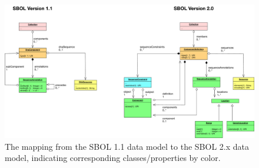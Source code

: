 \begin{figure}[h]
\begin{center}
  \includegraphics[width=\textwidth]{images/sbol_v1_to_v2}
\end{center}
\caption{\label{SBOL1TO2}The mapping from the SBOL 1.1 data model to the SBOL 2.x  data model, indicating corresponding classes/properties by color.}
\end{figure}
